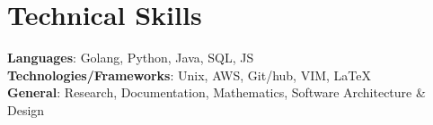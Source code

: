 \documentclass[letterpaper,11pt]{article}
\begin{document}
%
\section{Technical Skills}
 \begin{itemize}[leftmargin=0.15in, label={}]
    \small{\item{
     \textbf{Languages}{: Golang, Python, Java, SQL, JS} \\
     \textbf{Technologies/Frameworks}{: Unix, AWS, Git/hub, VIM, LaTeX} \\
     \textbf{General}{: Research, Documentation, Mathematics, Software Architecture \& Design} \\
    }}
 \end{itemize}
 \vspace{-16pt}
\end{document}
